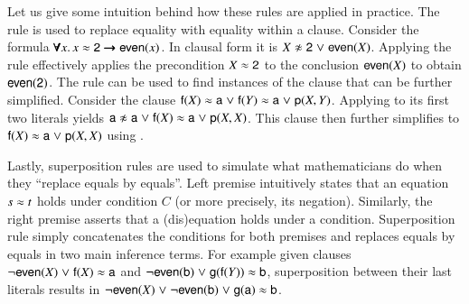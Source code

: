 \medskip
Let us give some intuition behind how these rules are applied in practice. The
 rule is used to replace equality with equality within a clause.
Consider the formula $\pmb\forall x.\,  x \approx \mathsf{2} \pmb\rightarrow \mathsf{even}(x)$. In
clausal form it is $X \noteq \cst{2} \llor \cst{even}(X)$. Applying the
 rule effectively applies the precondition $X \approx \mathsf{2}$ to the
conclusion $\mathsf{even}(X)$ to obtain $\mathsf{even}(\mathsf{2})$. The 
rule can be used to find instances of the clause that can be further simplified.
Consider the clause $\mathsf{f}(X) \approx \mathsf{a} \mathrel\lor \mathsf{f}(Y) \approx \mathsf{a} \mathrel\lor
\mathsf{p}(X, Y)$. Applying  to its first two literals yields $\cst{a}
\noteq \cst{a} \llor \cst{f}(X) \eq \cst{a} \llor \cst{p}(X, X)$. This clause
then further simplifies to $\mathsf{f}(X) \approx \mathsf{a} \mathrel\lor \mathsf{p}(X, X)$ using .

Lastly, superposition rules are used to simulate what mathematicians do when
they ``replace equals by equals''. Left premise intuitively states that an
equation $s \approx t$ holds under condition $C$ (or more precisely, its negation).
Similarly, the right premise asserts that a (dis)equation holds under a
condition. Superposition rule simply concatenates the conditions for both
premises and replaces equals by equals in two main inference terms. For example
given clauses $\neg \mathsf{even}(X) \mathrel\lor \mathsf{f}(X) \approx \mathsf{a}$ and $\neg
\mathsf{even}(\mathsf{b}) \mathrel\lor \mathsf{g}(\mathsf{f}(Y)) \approx \mathsf{b}$, superposition between their
last literals results in $\neg
\mathsf{even}(X) \mathrel\lor \neg \mathsf{even}(\mathsf{b}) \mathrel\lor \mathsf{g}(\mathsf{a}) \approx
\mathsf{b}$.






